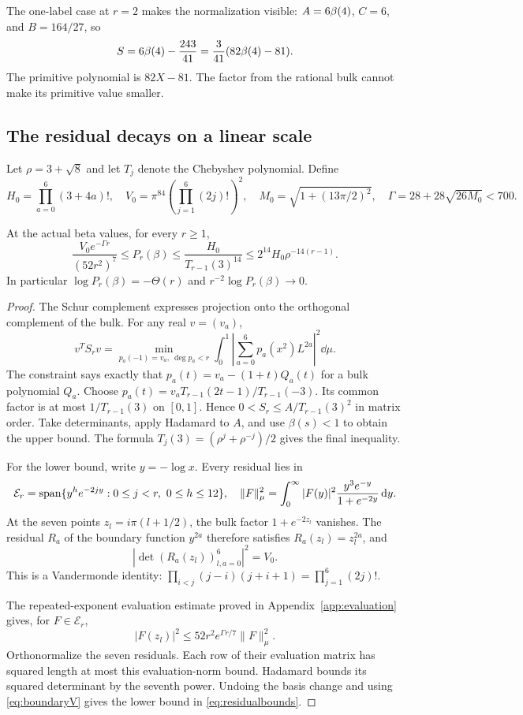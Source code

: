 The one-label case at $r=2$ makes the normalization visible:
$A=6\beta(4)$, $C=6$, and $B=164/27$, so
\[
 S=6\beta(4)-\frac{243}{41}
   =\frac3{41}(82\beta(4)-81).
\]
The primitive polynomial is $82X-81$. The factor from the rational
bulk cannot make its primitive value smaller.

\subsection{The residual decays on a linear scale}
Let $\rho=3+\sqrt8$ and let $T_j$ denote the Chebyshev polynomial.
Define
\[
 H_0=\prod_{a=0}^6(3+4a)!,\quad
 V_0=\pi^{84}\left(\prod_{j=1}^6(2j)!\right)^2,
 \quad M_0=\sqrt{1+(13\pi/2)^2},\quad
 \Gamma=28+28\sqrt{26M_0}<700.
\]
\begin{theorem}\label{thm:residual}
At the actual beta values, for every $r\geq1$,
\begin{equation}\label{eq:residualbounds}
 \frac{V_0e^{-\Gamma r}}{(52r^2)^7}
 \leq P_r(\beta)
 \leq\frac{H_0}{T_{r-1}(3)^{14}}
 \leq2^{14}H_0\rho^{-14(r-1)}.
\end{equation}
In particular $\log P_r(\beta)=-\Theta(r)$ and
$r^{-2}\log P_r(\beta)\longrightarrow0$.
\end{theorem}
\begin{proof}
The Schur complement expresses projection onto the orthogonal complement
of the bulk. For any real $v=(v_a)$,
\[
 v^TS_rv=\min_{p_a(-1)=v_a,\ \deg p_a<r}
       \int_0^1\left|\sum_{a=0}^6p_a(x^2)L^{2a}\right|^2\dd\mu.
\]
The constraint says exactly that $p_a(t)=v_a-(1+t)Q_a(t)$ for a bulk
polynomial $Q_a$. Choose
$p_a(t)=v_aT_{r-1}(2t-1)/T_{r-1}(-3)$.
Its common factor is at most $1/T_{r-1}(3)$ on $[0,1]$. Hence
$0<S_r\leq A/T_{r-1}(3)^2$ in matrix order. Take determinants,
apply Hadamard to $A$, and use $\beta(s)<1$ to obtain the upper bound.
The formula $T_j(3)=(\rho^j+\rho^{-j})/2$ gives the final inequality.

For the lower bound, write $y=-\log x$. Every residual lies in
\[
 \mathcal E_r=\operatorname{span}\{y^he^{-2jy}:0\leq j<r,\ 0\leq h\leq12\},
 \quad
 \|F\|_\mu^2=\int_0^\infty
       |F(y)|^2\frac{y^3e^{-y}}{1+e^{-2y}}\,\mathrm d y.
\]
At the seven points $z_l=i\pi(l+1/2)$, the bulk factor $1+e^{-2z_l}$
vanishes. The residual $R_a$ of the boundary function $y^{2a}$
therefore satisfies $R_a(z_l)=z_l^{2a}$, and
\begin{equation}\label{eq:boundaryV}
 |\det(R_a(z_l))_{l,a=0}^6|^2=V_0.
\end{equation}
This is a Vandermonde identity: $\prod_{i<j}(j-i)(j+i+1)=
\prod_{j=1}^6(2j)!$.

The repeated-exponent evaluation estimate proved in
Appendix~\ref{app:evaluation} gives, for $F\in\mathcal E_r$,
\[
 |F(z_l)|^2\leq52r^2e^{\Gamma r/7}\|F\|_\mu^2.
\]
Orthonormalize the seven residuals. Each row of their evaluation matrix
has squared length at most this evaluation-norm bound. Hadamard bounds
its squared determinant by the seventh power. Undoing the basis change
and using \eqref{eq:boundaryV} gives the lower bound in
\eqref{eq:residualbounds}.
\end{proof}

